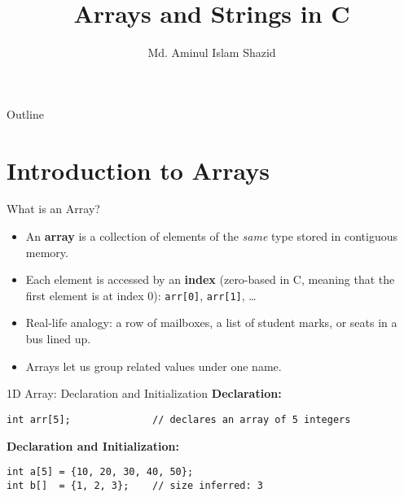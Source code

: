 \documentclass[12pt, aspectratio=169]{beamer}
\title{Arrays and Strings in C}
\author{Md. Aminul Islam Shazid}
\date{}
\begin{document}
    {
		\addtocounter{framenumber}{-2}    %

		\begin{frame}
			\titlepage
		\end{frame}

		\begin{frame}{Outline}
            \vfill
			\tableofcontents[subsectionstyle=hide]
            \vfill
		\end{frame}
	}


\section{Introduction to Arrays}


    \begin{frame}{What is an Array?}
        \begin{itemize}
            \item An \textbf{array} is a collection of elements of the \emph{same} type stored in contiguous memory.
            \item Each element is accessed by an \textbf{index} (zero-based in C, meaning that the first element is at index 0): \texttt{arr[0]}, \texttt{arr[1]}, \dots
            \item Real-life analogy: a row of mailboxes, a list of student marks, or seats in a bus lined up.
            \item Arrays let us group related values under one name.
        \end{itemize}
    \end{frame}

    \begin{frame}[fragile]{1D Array: Declaration and Initialization}
        \textbf{Declaration:}
        \begin{verbatim}
int arr[5];              // declares an array of 5 integers
        \end{verbatim}

        \textbf{Declaration and Initialization:}
        \begin{verbatim}
int a[5] = {10, 20, 30, 40, 50};
int b[]  = {1, 2, 3};    // size inferred: 3
        \end{verbatim}
    \end{frame}
\end{document}
